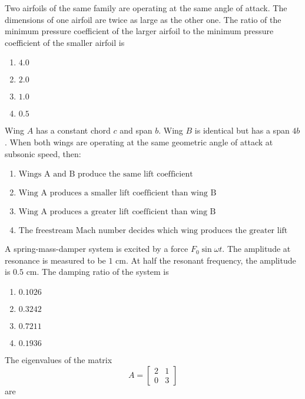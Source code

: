 \bigskip
\item Two airfoils of the same family are operating at the same angle of attack. The dimensions of one airfoil are twice as large as the other one. The ratio of the minimum pressure coefficient of the larger airfoil to the minimum pressure coefficient of the smaller airfoil is
\begin{multicols}{2}
    \begin{enumerate}
        \item $ 4.0 $
        \item $ 2.0 $
        \item $ 1.0 $
        \item $ 0.5 $
    \end{enumerate}
\end{multicols}
\bigskip
\item Wing $A$ has a constant chord $c$ and span $b$. Wing $B$ is identical but has a span $4b$. When both wings are operating at the same geometric angle of attack at subsonic speed, then:
    \begin{enumerate}
        \item $ \text{Wings A and B produce the same lift coefficient} $
        \item $ \text{Wing A produces a smaller lift coefficient than wing B} $
        \item $ \text{Wing A produces a greater lift coefficient than wing B} $
        \item $ \text{The freestream Mach number decides which wing produces the greater lift coefficient} $
    \end{enumerate}
\bigskip
\item A spring-mass-damper system is excited by a force $F_0 \sin \omega t$. The amplitude at resonance is measured to be $1$ cm. At half the resonant frequency, the amplitude is $0.5$ cm. The damping ratio of the system is
\begin{multicols}{2}
    \begin{enumerate}
        \item $ 0.1026 $
        \item $ 0.3242 $
        \item $ 0.7211 $
        \item $ 0.1936 $
    \end{enumerate}
\end{multicols}
\bigskip
\item The eigenvalues of the matrix\[A = \begin{bmatrix} 2 & 1 \\0 & 3\end{bmatrix}\]are
